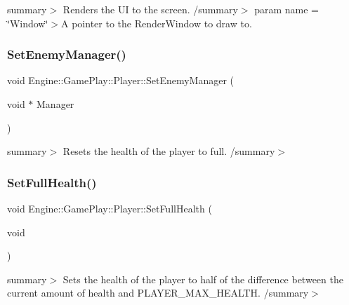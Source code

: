 summary$>$ Renders the UI to the screen. /summary$>$ param name = \char`\"{}\+Window\char`\"{}$>$A pointer to the Render\+Window to draw to.\mbox{\label{class_engine_1_1_game_play_1_1_player_adedc5552f70e5495ca1391b6f6143bec}} 
\subsubsection{\texorpdfstring{Set\+Enemy\+Manager()}{SetEnemyManager()}}
{\footnotesize\ttfamily void Engine\+::\+Game\+Play\+::\+Player\+::\+Set\+Enemy\+Manager (\begin{DoxyParamCaption}\item[{void $\ast$}]{Manager }\end{DoxyParamCaption})}

summary$>$ Resets the health of the player to full. /summary$>$ \mbox{\label{class_engine_1_1_game_play_1_1_player_a426ebc69b0607902e73563655ad66693}} 
\subsubsection{\texorpdfstring{Set\+Full\+Health()}{SetFullHealth()}}
{\footnotesize\ttfamily void Engine\+::\+Game\+Play\+::\+Player\+::\+Set\+Full\+Health (\begin{DoxyParamCaption}\item[{void}]{ }\end{DoxyParamCaption})}

summary$>$ Sets the health of the player to half of the difference between the current amount of health and P\+L\+A\+Y\+E\+R\+\_\+\+M\+A\+X\+\_\+\+H\+E\+A\+L\+TH. /summary$>$ \mbox{\label{class_engine_1_1_game_play_1_1_player_a06c682bf13c20fb2390807ec681b0121}} 
